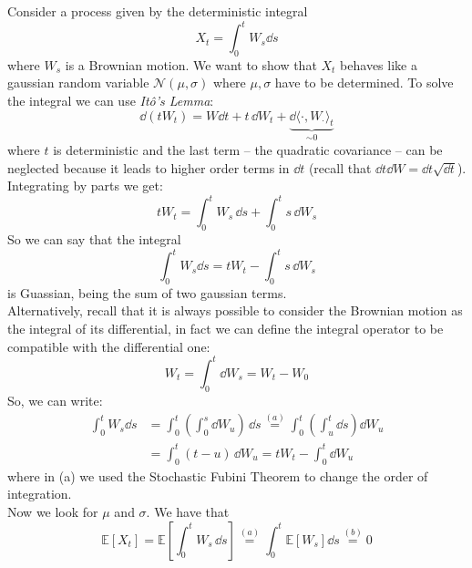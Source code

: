 \begin{example}{}{}{}
    Consider a process given by the deterministic integral
    \begin{equation*}
        X_t = \int^t_0 W_s\dd s
    \end{equation*}
    where $W_s$ is a Brownian motion. We want to show that $X_t$ behaves like a gaussian random variable $\mathcal{N}(\mu,\sigma)$ where $\mu, \sigma$ have to be determined. To solve the integral we can use \emph{Itô's Lemma}:
    \begin{equation*}
        \dd(tW_t) = W\dd t + t\,\dd W_t + \underbrace{\dd\langle\cdot,W_{\cdot}\rangle_t}_{\sim 0}
    \end{equation*}
    where $t$ is deterministic and the last term -- the quadratic covariance -- can be neglected because it leads to higher order terms in $\dd t$ (recall that $\dd t\dd W = \dd t\sqrt{\dd t}$). Integrating by parts we get:
    \begin{equation*}
        tW_t = \int^t_0 W_s\,\dd s + \int^t_0 s\,\dd W_s
    \end{equation*}
    So we can say that the integral
    \begin{equation*}
        \int^t_0 W_s\dd s = tW_t - \int^t_0 s\,\dd W_s
    \end{equation*}
    is Guassian, being the sum of two gaussian terms. \\
    Alternatively, recall that it is always possible to consider the Brownian motion as the integral of its differential, in fact we can define the integral operator to be compatible with the differential one:
    \begin{equation*}
        W_t = \int^t_0 \dd W_s = W_t - W_0
    \end{equation*}
    So, we can write:
    \begin{align*}
        \int^t_0 W_s\dd s &= \int^t_0\left(\int^s_0 \dd W_u\right)\,\dd s \overset{(a)}{=} \int^t_0\left(\int^t_u \dd s\right)\dd W_u \\
        &=
        \int^t_0(t-u)\,\dd W_u = tW_t - \int^t_0\dd W_u
    \end{align*}
    where in (a) we used the Stochastic Fubini Theorem to change the order of integration.\\
    Now we look for $\mu$ and $\sigma$. We have that
    \begin{equation*}
        \mathbb{E}[X_t] = \mathbb{E}\left[\int^t_0 W_s\,\dd s \right] \overset{(a)}{=} \int^t_0 \mathbb{E}[W_s]\dd s \overset{(b)}{=} 0
    \end{equation*}

\end{example}
